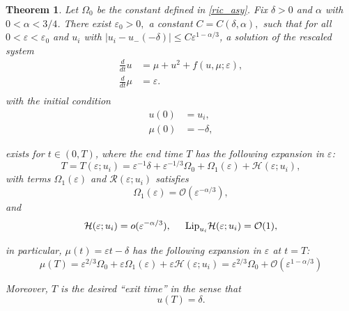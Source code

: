 \documentclass[letterpaper,11pt]{article}
\newcommand{\rmO}{\mathcal{O}}
\newcommand{\eps}{\varepsilon}
\numberwithin{equation}{section}
\theoremstyle{plain}
\newtheorem{theorem}{Theorem}[section]
\begin{document}
\begin{theorem}\label{thm:main}Let $\Omega_0$ be the constant defined in \eqref{ric_asy}.
Fix $\delta>0$ and $\alpha$ with $0<\alpha <3/4$. There exist $\eps_0>0,$ a constant $C=C(\delta,\alpha),$ such that for all $0<\eps<\eps_0$ and $u_i$ with $|u_i -u_-(-\delta) | \le C\eps^{1-\alpha/3}$, a solution of the rescaled system 
\begin{equation}\label{main_eqn}
\begin{split}
\frac{d}{dt}u &= \mu+u^2+ f(u,\mu;\eps), \\
\frac{d}{dt} \mu &= \eps.  \\
\end{split}
\end{equation}
with the initial condition
\begin{equation}\label{main_ic}
\begin{split}
u(0) &= u_i, \\
\mu(0) &= -\delta,
\end{split}
\end{equation}

exists for $t \in (0,T)$, where the end time $T$ has the following expansion in $\eps$:
\begin{equation}\label{T_exp_+}
T = T(\eps ; u_i) = \eps^{-1}\delta + \eps^{-1/3}\Omega_0 + \Omega_1(\eps) + \mathcal{H}(\eps; u_i),
\end{equation}
with terms $\Omega_1(\eps)$ and $\mathcal{R}(\eps;u_i)$ satisfies 
\begin{equation}\label{Omega_1_exp}
\Omega_1(\eps) = \rmO(\eps^{-\alpha/3}),
\end{equation}
and
\begin{equation}\label{T_remainder_exp}
\mathcal{H}(\eps;u_i) = o(\eps^{-\alpha/3}), \hspace{0.2in} \text{Lip}_{u_i}\mathcal{H}(\eps;u_i) = \rmO(1),
\end{equation}

in particular, $\mu(t) = \eps t -\delta$ has the following expansion in $\eps$ at $t=T$:
\begin{equation}\label{exit_loc_exp}
\mu(T) = \eps^{2/3}\Omega_0 + \eps\Omega_1(\eps) + \eps\mathcal{H}(\eps; u_i) = \eps^{2/3}\Omega_0 + \rmO(\eps^{1-\alpha/3})
\end{equation}

Moreover, $T$ is the desired ``exit time'' in the sense that 
\begin{equation}\label{exit_time_cond}
 u(T) = \delta.
\end{equation}
\end{theorem}
\end{document}
